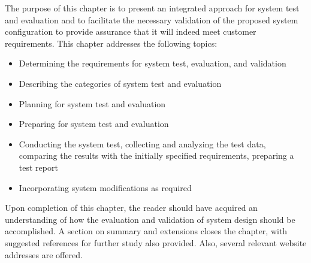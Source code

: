 The purpose of this chapter is to present an integrated approach for system test and evaluation and to facilitate the necessary validation of the proposed system configuration to provide assurance that it will indeed meet customer requirements. This chapter addresses the following topics:

\begin{itemize}
\item Determining the requirements for system test, evaluation, and validation
\item Describing the categories of system test and evaluation
\item Planning for system test and evaluation
\item Preparing for system test and evaluation
\item Conducting the system test, collecting and analyzing the test data, comparing the results with the initially specified requirements, preparing a test report
\item Incorporating system modifications as required
\end{itemize}

Upon completion of this chapter, the reader should have acquired an understanding of how the evaluation and validation of system design should be accomplished. A section on summary and extensions closes the chapter, with suggested references for further study also provided. Also, several relevant website addresses are offered.